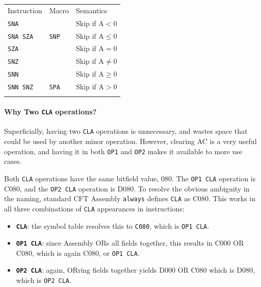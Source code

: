 \documentclass[11pt,a4paper,twocolumns]{article}
\newcommand\zebra{\rowcolors{2}{gray!10}{white}}
\newcommand\hex[1]{\textsf{#1}}
\newcommand\register[1]{\textsf{#1}}
\newcommand\A{\register{AC}}
\begin{document}
\vspace{1em}\noindent\begin{center}
\zebra
\begin{tabular}{lll}
  Instruction & Macro & Semantics \\\noalign{\smallskip}\hline\noalign{\smallskip}
  {\tt SNA }     &           & Skip if $\mbox{A} < 0$ \\
  {\tt SNA SZA } & {\tt SNP} & Skip if $\mbox{A} \leq 0$ \\
  {\tt SZA }     &           & Skip if $\mbox{A} = 0$ \\
  {\tt SNZ }     &           & Skip if $\mbox{A} \not= 0$ \\
  {\tt SNN }     &           & Skip if $\mbox{A} \geq 0$ \\
  {\tt SNN SNZ } & {\tt SPA} & Skip if $\mbox{A} > 0$ \\
  \noalign{\smallskip}\hline\noalign{\smallskip}
\end{tabular}
\end{center}\vspace{1em}

\paragraph{Why Two {\tt CLA} operations?}
\label{sec-cla2}
Superficially, having two {\tt CLA} operations is unnecessary, and wastes
space that could be used by another minor operation. However, clearing
\A{} is a very useful operation, and having it in both {\tt OP1} and
  {\tt OP2} makes it available to more use cases.

Both {\tt CLA} operations have the same bitfield value, \hex{080}. The
{\tt OP1 CLA} operation is \hex{C080}, and the {\tt OP2 CLA} operation
is \hex{D080}. To resolve the obvious ambiguity in the naming,
standard CFT Assembly {\tt always\/} defines {\tt CLA} as
\hex{C080}. This works in all three combinations of {\tt CLA}
appearances in instructions:

\begin{itemize}
\item{\textbf{\tt CLA}:} the symbol table resolves this to {\tt C080},
  which is {\tt OP1 CLA}.
\item{\textbf{\tt OP1 CLA}:} since Assembly ORs all fields together,
  this results in \hex{C000 OR C080}, which is again \hex{C080}, or
  {\tt OP1 CLA}.
\item{\textbf{\tt OP2 CLA}:} again, ORring fields together yields
  \hex{D000 OR C080} which is \hex{D080}, which is {\tt OP2 CLA}.
\end{itemize}
\end{document}
